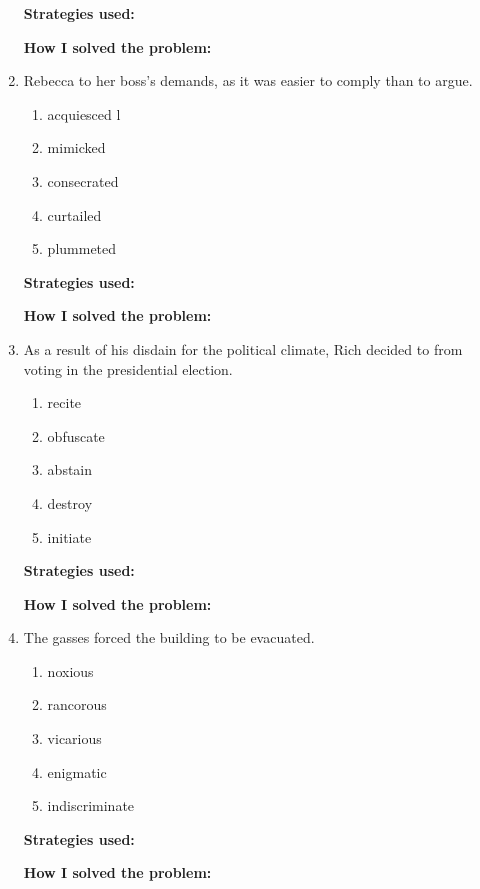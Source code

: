 \begin{enumerate}
\large{\textbf{Strategies used:}} \hrulefill

\large{\textbf{How I solved the problem:}} \hrulefill

\item Rebecca \underline{\hspace{2in}} to her boss’s demands, as it was easier to comply than to argue.

\begin{enumerate} [label=(\Alph*)]
\item acquiesced l
\item mimicked  
\item consecrated 
\item curtailed
\item plummeted
\end{enumerate}

\large{\textbf{Strategies used:}} \hrulefill

\large{\textbf{How I solved the problem:}} \hrulefill

\item\sloppy As a result of his disdain for the political climate, Rich decided to \underline{\hspace{2in}} from voting in the presidential election.

\begin{enumerate} [label=(\Alph*)]
\item recite
\item obfuscate
\item abstain
\item destroy
\item initiate
\end{enumerate}

\large{\textbf{Strategies used:}} \hrulefill

\large{\textbf{How I solved the problem:}} \hrulefill

\item The \underline{\hspace{2in}} gasses forced the building to be evacuated.

\begin{enumerate} [label=(\Alph*)]
\item noxious
\item rancorous
\item vicarious
\item enigmatic
\item indiscriminate
\end{enumerate}

\large{\textbf{Strategies used:}} \hrulefill

\large{\textbf{How I solved the problem:}} \hrulefill

\end{enumerate}

